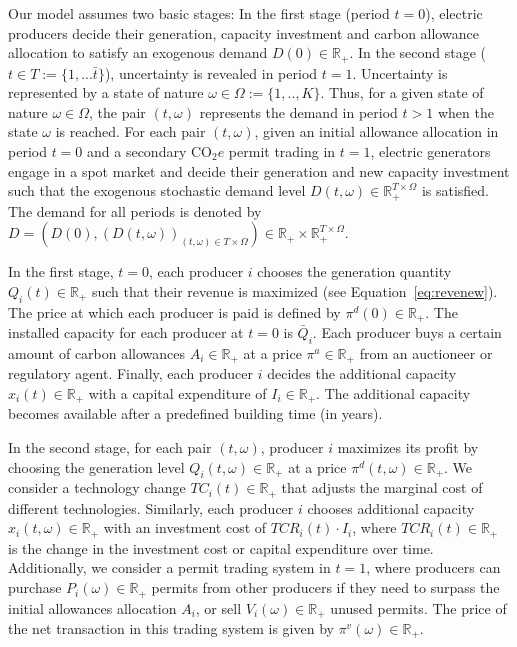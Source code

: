 \documentclass[11pt, letterpaper]{article}
\begin{document}
\smallskip

Our model assumes two basic stages: In the first stage (period $t=0$), electric producers decide their generation, capacity investment and carbon allowance allocation to satisfy an exogenous demand $D(0)\in\mathbb{R}_+$. In the second stage ($t\in T:=\{1,...\bar{t}\}$), uncertainty is revealed in period $t=1$. Uncertainty is represented by a state of nature $\omega\in\Omega:=\{1,..,K\}$. Thus, for a given state of nature $\omega\in\Omega$, the pair $(t,\omega)$ represents the demand in period $t>1$ when the state $\omega$ is reached. For each pair $(t,\omega)$, given an initial allowance allocation in period $t=0$ and a secondary CO$_2e$ permit trading in $t=1$, electric generators engage in a spot market and decide their generation and new capacity investment such that the exogenous stochastic demand level $D(t,\omega)\in\mathbb{R}_+^{T\times\Omega}$ is satisfied. The demand for all periods is denoted by $D=\left(D(0),(D(t,\omega))_{(t,\omega)\in T\times\Omega}\right)\in\mathbb{R}_+\times\mathbb{R}_+^{T\times\Omega}$.

\smallskip
In the first stage, $t=0$, each producer $i$ chooses the generation quantity $Q_i(t)\in\mathbb{R}_+$ such that their revenue is maximized (see Equation~\ref{eq:revenew}). The price at which each producer is paid is defined by $\pi^d(0)\in\mathbb{R}_+$. The installed capacity for each producer at $t=0$ is $\bar{Q}_i$. Each producer buys a certain amount of carbon allowances $A_i\in\mathbb{R}_+$ at a price $\pi^{a}\in\mathbb{R}_+$ from an auctioneer or regulatory agent. Finally, each producer $i$ decides the additional capacity $x_i(t)\in\mathbb{R}_+$ with a capital expenditure of $I_i\in\mathbb{R}_+$. The additional capacity becomes available after a predefined building time (in years). 

\smallskip
In the second stage, for each pair $(t,\omega)$, producer $i$ maximizes its profit by choosing the generation level $Q_i(t,\omega)\in\mathbb{R}_+$ at a price $\pi^d(t,\omega)\in\mathbb{R}_+$. We consider a technology change $TC_i(t) \in\mathbb{R}_+$ that adjusts the marginal cost of different technologies. Similarly, each producer $i$ chooses additional capacity $x_i(t,\omega)\in\mathbb{R}_+$ with an investment cost of $TCR_i(t)\cdot I_i$, where $TCR_i(t)\in\mathbb{R}_+$ is the change in the investment cost or capital expenditure over time. Additionally, we consider a permit trading system in $t=1$, where producers can purchase $P_i(\omega)\in\mathbb{R}_+$ permits from other producers if they need to surpass the initial allowances allocation $A_i$, or sell $V_i(\omega)\in\mathbb{R}_+$ unused permits. The price of the net transaction in this trading system is given by $\pi^v(\omega)\in\mathbb{R}_+$.
\end{document}
